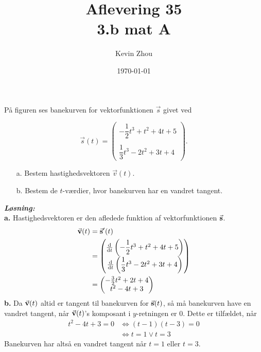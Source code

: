 \documentclass{article}
\title{Aflevering 35\\
{\Large \textbf{3.b mat A}}}
\author{Kevin Zhou}
\date{\today}
\newcommand{\sol}{\setlength{\parindent}{0cm}\textbf{\textit{Løsning:}}\setlength{\parindent}{1cm}}
\begin{document}
\maketitle
\newpage
\begin{question}{}{}
  På figuren ses banekurven for vektorfunktionen $\vec{s}$ givet ved

$$\vec{s}(t)=\begin{pmatrix}-\dfrac{1}{2}t^3+t^2+4t+5\\\\\dfrac{1}{3}t^3-2t^2+3t+4\end{pmatrix}.$$

\begin{itemize}
  \item[a.] Bestem hastighedsvektoren $\vec{v}(t)$.
  \item[b.] Bestem de $t$-værdier, hvor banekurven har en vandret tangent.
\end{itemize}
\end{question}
\sol \\
\textbf{a.}
Hastighedsvektoren er den afledede funktion af vektorfunktionen $\va{s}$.
\begin{equation*}
\begin{split}
  \va{v}(t)&=\va{s}'(t)\\
  &=\mqty(\dv{t} \left(-\dfrac{1}{2}t^3+t^2+4t+5\right) \\ \dv{t} \left(\dfrac{1}{3}t^3-2t^2+3t+4\right) ) \\
  &=\mqty(-\frac{3}{2}t^2+2t+4\\ t^2-4t+3)
\end{split}
\end{equation*}
\textbf{b.}
Da $\va{v}(t)$ altid er tangent til banekurven for $\va{s} (t)$, så må banekurven have en vandret tangent, når $\va{v}(t)$'s komposant i $y$-retningen er 0.
Dette er tilfældet, når
\begin{equation*}
\begin{split}
  t^2-4t+3=0 &\iff (t-1)(t-3)=0\\
  &\iff t=1 \lor t=3
\end{split}
\end{equation*}
Banekurven har altså en vandret tangent når $t=1$ eller $t=3$. 
\end{document}
